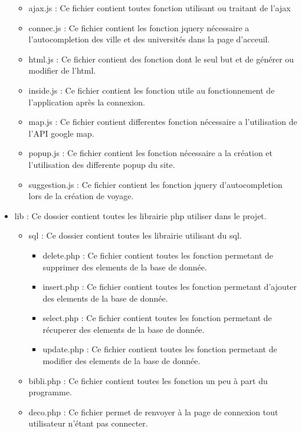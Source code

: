 \documentclass[a4paper,10pt]{report}
\begin{document}
\begin{itemize}
\begin{itemize}
\begin{itemize}
        \end{itemize}
        \item ajax.js : Ce fichier contient toutes fonction utilisant ou traitant de l'ajax
        \item connec.js : Ce fichier contient les fonction jquery nécessaire a l'autocompletion des ville et des universités dans la page d'acceuil.
        \item html.js : Ce fichier contient des fonction dont le seul but et de générer ou modifier de l'html.
        \item inside.js : Ce fichier contient les fonction utile au fonctionnement de l'application après la connexion.
        \item map.js : Ce fichier contient differentes fonction nécessaire a l'utilisation de l'API google map.
        \item popup.js : Ce fichier contient les fonction nécessaire a la création et l'utilisation des differente popup du site.
        \item suggestion.js : Ce fichier contient les fonction jquery d'autocompletion lors de la création de voyage.
    \end{itemize}
    \item lib : Ce dossier contient toutes les librairie php utiliser dans le projet.
    \begin{itemize}
        \item sql : Ce dossier contient toutes les librairie utilisant du sql.
        \begin{itemize}
            \item delete.php : Ce fichier contient toutes les fonction permetant de supprimer des elements de la base de donnée.
            \item insert.php : Ce fichier contient toutes les fonction permetant d'ajouter des elements de la base de donnée.
            \item select.php : Ce fichier contient toutes les fonction permetant de récuperer des elements de la base de donnée.
            \item update.php : Ce fichier contient toutes les fonction permetant de modifier des elements de la base de donnée.
        \end{itemize}
        \item bibli.php : Ce fichier contient toutes les fonction un peu à part du programme.
        \item deco.php : Ce fichier permet de renvoyer à la page de connexion tout utilisateur n'étant pas connecter.

\end{itemize}
\end{itemize}
\end{document}
